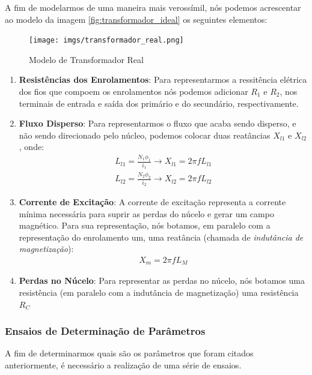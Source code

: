 \documentclass{article}
\begin{document}
A fim de modelarmos de uma maneira mais verossímil, nós podemos acrescentar ao modelo da imagem \ref{fig:transformador_ideal} os seguintes elementos:

\begin{figure}[h]
    \centering
    \texttt{[image: imgs/transformador\_real.png]}
    \caption{Modelo de Transformador Real}
    \label{fig:trasnformador_real}
\end{figure}

\begin{enumerate}
    \item \textbf{Resistências dos Enrolamentos}: Para representarmos a ressitência elétrica dos fios que compoem os enrolamentos nós podemos adicionar $R_1$ e $R_2$, nos terminais de entrada e saída dos primário e do secundário, respectivamente.
    \item \textbf{Fluxo Disperso}: Para representarmos o fluxo que acaba sendo disperso, e não sendo direcionado pelo núcleo, podemos colocar duas reatâncias $X_{l1}$ e $X_{l2}$, onde:
    \begin{align}
        L_{l1} = \frac{N_1 \phi_1}{i_1} \rightarrow X_{l1} = 2\pi f L_{l1} \\
        L_{l2} = \frac{N_2 \phi_2}{i_2} \rightarrow X_{l2} = 2\pi f L_{l2}
    \end{align}

    \item \textbf{Corrente de Excitação}: A corrente de excitação representa a corrente mínima necessária para suprir as perdas do núcelo e gerar um campo magnético. Para sua representação, nós botamos, em paralelo com a representação do enrolamento um, uma reatância (chamada de \emph{indutância de magnetização}):
    \begin{align}
        X_m = 2\pi fL_M
    \end{align}

    \item \textbf{Perdas no Núcelo}: Para representar as perdas no núcelo, nós botamos uma resistência (em paralelo com a indutância  de magnetização) uma resistência $R_C$
\end{enumerate}

\newpage
\subsubsection{Ensaios de Determinação de Parâmetros}
A fim de determinarmos quais são os parâmetros que foram citados anteriormente, é necessário a realização de uma série de ensaios.
\end{document}
